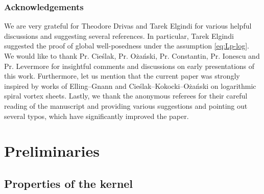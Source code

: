 \documentclass[JEP,XML,SOM,Unicode,NoFloatCountersInSection,published]{cedram}
\theoremstyle{plain}
\theoremstyle{definition}
\begin{document}
\subsubsection*{Acknowledgements}
We are very grateful for Theodore Drivas and Tarek Elgindi for various helpful discussions and suggesting several references. In particular, Tarek Elgindi suggested the proof of global well-posedness under the assumption \eqref{eq:Lp-log}. We would like to thank Pr. Cie{\'s}lak, Pr. O{\.z}a{\'n}ski, Pr. Constantin, Pr. Ionescu and Pr. Levermore for insightful comments and discussions on early presentations of this work. Furthermore, let us mention that the current paper was strongly inspired by works of Elling--Gnann and Cie{\'s}lak--Kokocki--O{\.z}a{\'n}ski on logarithmic spiral vortex sheets. Lastly, we thank the anonymous referees for their careful reading of the manuscript and providing various suggestions and pointing out several typos, which have significantly improved the paper.

\section{Preliminaries}\label{sec:prelim}

\subsection{Properties of the kernel}\label{subsec:elliptic}
\end{document}
